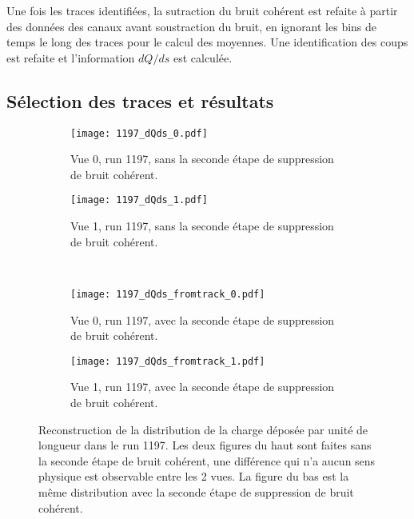       Une fois les traces identifiées, la sutraction du bruit cohérent est refaite à partir des données des canaux avant soustraction du bruit, en ignorant les bins de temps le long des traces pour le calcul des moyennes. Une identification des coups est refaite et l'information $dQ/ds$ est calculée.

    \subsection{Sélection des traces et résultats}

      \begin{figure}[htbp]
        \centering
        \begin{subfigure}[t]{0.48\textwidth}
          \centering
          \texttt{[image: 1197\_dQds\_0.pdf]}
          \caption[]{Vue 0, run 1197, sans la seconde étape de suppression de bruit cohérent.}
        \end{subfigure}\hfill
        \begin{subfigure}[t]{0.48\textwidth}
          \centering
          \texttt{[image: 1197\_dQds\_1.pdf]}
          \caption[]{Vue 1,  run 1197, sans la seconde étape de suppression de bruit cohérent.}
        \end{subfigure}\\
        \begin{subfigure}[t]{0.48\textwidth}
          \centering
          \texttt{[image: 1197\_dQds\_fromtrack\_0.pdf]}
          \caption[]{Vue 0, run 1197, avec la seconde étape de suppression de bruit cohérent.}
        \end{subfigure}\hfill
        \begin{subfigure}[t]{0.48\textwidth}
          \centering
          \texttt{[image: 1197\_dQds\_fromtrack\_1.pdf]}
          \caption[]{Vue 1, run 1197, avec la seconde étape de suppression de bruit cohérent.}
        \end{subfigure}
        \caption[Reconstruction de la distribution de la charge déposée par unité de longueur dans le run 1197.]{\label{fig::dqds_1197_Rawdatasoft}Reconstruction de la distribution de la charge déposée par unité de longueur dans le run 1197. Les deux figures du haut sont faites sans la seconde étape de bruit cohérent, une différence qui n'a aucun sens physique est observable entre les 2 vues. La figure du bas est la même distribution avec la seconde étape de suppression de bruit cohérent.}
      \end{figure}


